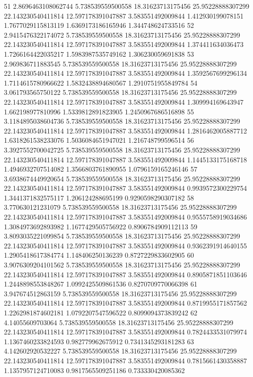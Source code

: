 {51 2.8696463108062744 5.738539559500558 18.31623713175456 25.95228888307299 22.143230540411814 12.597178391047887 3.583551492009844 1.412930199078151 1.7677029115813119 1.6369173186165946 1.344748624733516
52 2.9415476322174072 5.738539559500558 18.31623713175456 25.95228888307299 22.143230540411814 12.597178391047887 3.583551492009844 1.374411634036473 1.7266164422035217 1.5983987535749162 1.306230059691838
53 2.969836711883545 5.738539559500558 18.31623713175456 25.95228888307299 22.143230540411814 12.597178391047887 3.583551492009844 1.3592567699296134 1.7114615780966622 1.5832438894680567 1.2910751955849784
54 3.061793565750122 5.738539559500558 18.31623713175456 25.95228888307299 22.143230540411814 12.597178391047887 3.583551492009844 1.309994169643947 1.662198977810996 1.5339812891823905 1.2450967686516898
55 3.1184895038604736 5.738539559500558 18.31623713175456 25.95228888307299 22.143230540411814 12.597178391047887 3.583551492009844 1.2816462005887712 1.6318261538233076 1.5036084651947021 1.216748799596514
56 3.3927552700042725 5.738539559500558 18.31623713175456 25.95228888307299 22.143230540411814 12.597178391047887 3.583551492009844 1.1445133175168718 1.4946932707514082 1.3566803761890955 1.0796159165246146
57 3.6938674449920654 5.738539559500558 18.31623713175456 25.95228888307299 22.143230540411814 12.597178391047887 3.583551492009844 0.9939572300229754 1.3441371832575117 1.206124288695199 0.9290598290307182
58 3.770630121231079 5.738539559500558 18.31623713175456 25.95228888307299 22.143230540411814 12.597178391047887 3.583551492009844 0.9555758919034686 1.3084973692893982 1.1677429505756922 0.8906784909112113
59 3.8093035221099854 5.738539559500558 18.31623713175456 25.95228888307299 22.143230540411814 12.597178391047887 3.583551492009844 0.9362391914640155 1.2905418617384774 1.148406250136239 0.8727229833602905
60 3.9076309204101562 5.738539559500558 18.31623713175456 25.95228888307299 22.143230540411814 12.597178391047887 3.583551492009844 0.8905871851103646 1.2448898553848267 1.0992425509861536 0.8270709770066398
61 3.947674512863159 5.738539559500558 18.31623713175456 25.95228888307299 22.143230540411814 12.597178391047887 3.583551492009844 0.8719955171857562 1.2262981874602181 1.0792207547596522 0.8099094373839242
62 4.14055609703064 5.738539559500558 18.31623713175456 25.95228888307299 22.143230540411814 12.597178391047887 3.583551492009844 0.7824433531079974 1.1367460233824593 0.982779962675912 0.7341345293181283
63 4.142602920532227 5.738539559500558 18.31623713175456 25.95228888307299 22.143230540411814 12.597178391047887 3.583551492009844 0.7815661430358887 1.1357957124710083 0.9817565509251186 0.733330420085362
}
